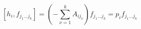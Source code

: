 \begin{equation}\label{pi}
[h_i, f_{j_1 \dots j_k}] = \left( - \sum_{\nu=1}^k  A_{ij_\nu} \right) 
f_{j_1 \dots j_k}  = p_i f_{j_1 \dots j_k}
\end{equation}

